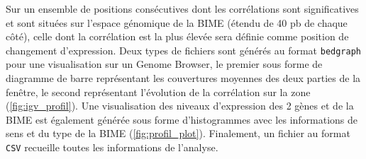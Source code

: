 \documentclass[12pt,a4paper]{report}
\begin{document}
\begin{onehalfspace}
Sur un ensemble de positions consécutives dont les corrélations sont significatives et sont situées sur l'espace génomique de la BIME (étendu de 40 pb de chaque côté), celle dont la corrélation est la plus élevée sera définie comme position de changement d'expression. Deux types de fichiers sont générés au format \texttt{bedgraph} pour une visualisation sur un Genome Browser, le premier sous forme de diagramme de barre représentant les couvertures moyennes des deux parties de la fenêtre, le second représentant l'évolution de la corrélation sur la zone (\autoref{fig:igv_profil}). Une visualisation des niveaux d'expression des 2 gènes et de la BIME est également générée sous forme d'histogrammes avec les informations de sens et du type de la BIME (\autoref{fig:profil_plot}). Finalement, un fichier au format \texttt{CSV} recueille toutes les informations de l'analyse.

\begin{figure}
\end{figure}


\end{onehalfspace}
\end{document}
